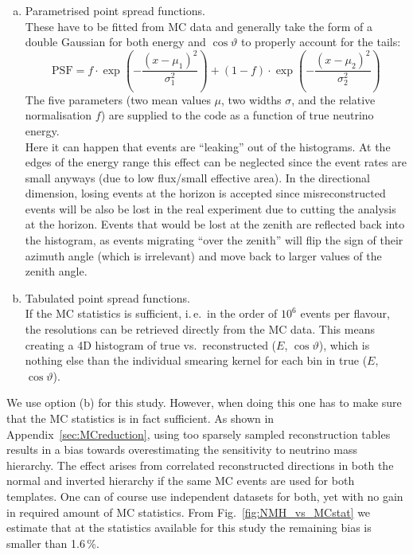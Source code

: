 \begin{enumerate}[(a)]
 \item Parametrised point spread functions.\\ These have to be fitted from MC
  data and generally take the form of a double Gaussian for both energy and
  $\cos\vartheta$ to properly account for the tails:
  \begin{equation}
   \mathrm{PSF} = f\cdot \exp\left(-\frac{(x-\mu_1)^2}{\sigma_1^2}\right)
                  + (1-f)\cdot \exp\left(-\frac{(x-\mu_2)^2}{\sigma_2^2}\right)
   \label{eqn:reco_param}
  \end{equation}
  The five parameters (two mean values $\mu$, two widths $\sigma$, and the
  relative normalisation $f$) are supplied to the code as a function of true
  neutrino energy.\\
  Here it can happen that events are ``leaking'' out of the histograms. At
  the edges of the energy range this effect can be neglected since the event
  rates are small anyways (due to low flux/small effective area). In the
  directional dimension, losing events at the horizon is accepted since
  misreconstructed events will be also be lost in the real experiment due to
  cutting the analysis at the horizon. Events that would be lost at the zenith
  are reflected back into the histogram, as events migrating ``over the
  zenith'' will flip the sign of their azimuth angle (which is irrelevant) and
  move back to larger values of the zenith angle.
 \item Tabulated point spread functions.\\ If the MC statistics is sufficient,
  i.\,e.\ in the order of $10^6$ events per flavour, the resolutions can be
  retrieved directly from the MC data. This means creating a 4D histogram of
  true vs.\ reconstructed ($E$, $\cos\vartheta$), which is nothing else than
  the individual smearing kernel for each bin in true ($E$, $\cos\vartheta$).
  \end{enumerate}
We use option (b) for this study.
However, when doing this one has to make sure that the MC statistics is in fact
sufficient. As shown in Appendix~\ref{sec:MCreduction}, using too sparsely
sampled reconstruction tables results in a bias towards overestimating the
sensitivity to neutrino mass hierarchy.
The effect arises from correlated reconstructed directions in both the normal
and inverted hierarchy if the same MC events are used for both templates.
One can of course use independent datasets for both, yet with no gain in
required amount of MC statistics.
From Fig.~\ref{fig:NMH_vs_MCstat} we estimate that at the statistics available
for this study the remaining bias is smaller than 1.6\,\%.

